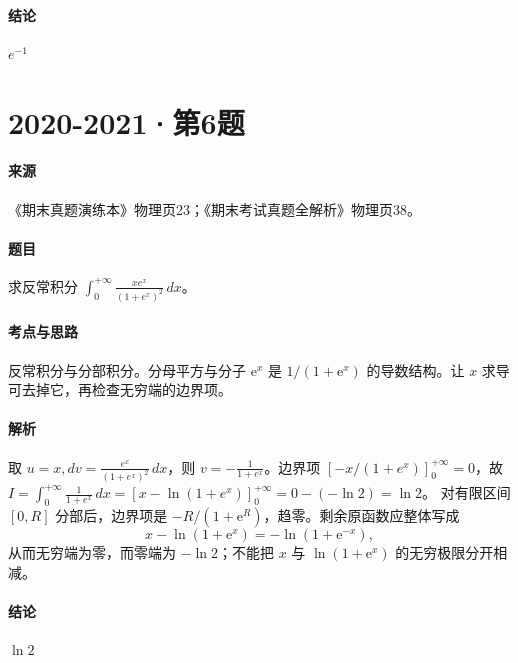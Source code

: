 \documentclass[UTF8,fontset=fandol,12pt,oneside,openany]{ctexrep}
\newcommand{\ee}{\mathrm e}
\theoremstyle{definition}
\begin{document}
\paragraph{结论}
$e^{-1}$

\par\addvspace{18pt}\noindent\begin{minipage}{\linewidth}
\section{2020-2021·第6题}
\label{exam:11:q14}
\paragraph{来源} 《期末真题演练本》物理页23；《期末考试真题全解析》物理页38。
\paragraph{题目}
求反常积分 $\int_0^{+\infty}\frac{xe^x}{(1+e^x)^2}\,dx$。
\end{minipage}\par
\paragraph{考点与思路}
反常积分与分部积分。分母平方与分子 $\ee^x$ 是 $1/(1+\ee^x)$ 的导数结构。让 $x$ 求导可去掉它，再检查无穷端的边界项。
\paragraph{解析}
取 $u=x,dv=\frac{e^x}{(1+e^x)^2}\,dx$，则 $v=-\frac1{1+e^x}$。边界项 $[-x/(1+e^x)]_0^{+\infty}=0$，故 $I=\int_0^{+\infty}\frac1{1+e^x}\,dx=[x-\ln(1+e^x)]_0^{+\infty}=0-(-\ln2)=\ln2$。
对有限区间 $[0,R]$ 分部后，边界项是 $-R/(1+\ee^R)$，趋零。剩余原函数应整体写成
\[
x-\ln(1+\ee^x)=-\ln(1+\ee^{-x}),
\]
从而无穷端为零，而零端为 $-\ln2$；不能把 $x$ 与 $\ln(1+\ee^x)$ 的无穷极限分开相减。
\paragraph{结论}
$\ln2$
\end{document}
